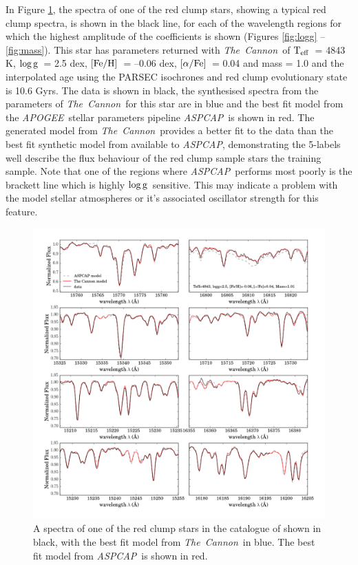 \documentclass[12pt, preprint]{aastex}
\newcommand{\project}[1]{\textsl{#1}}
\newcommand{\tc}{\project{The~Cannon}}
\newcommand{\apogee}{\project{APOGEE}}
\newcommand{\aspcap}{\project{ASPCAP}}
\newcommand{\teff}{\mbox{$\rm T_{eff}$}}
\newcommand{\feh}{\mbox{$\rm [Fe/H]$}}
\newcommand{\alphafe}{\mbox{$\rm [\alpha/Fe]$}}
\newcommand{\logg}{\mbox{$\rm \log g$}}
\begin{document}
In Figure \ref{fig:spectra}, the spectra of one of the red clump stars, showing a typical red clump spectra, is shown in the black line, for each of the wavelength regions for which the highest amplitude of the coefficients is shown (Figures \ref{fig:logg} -- \ref{fig:mass}).  This star has parameters returned with \tc\ of \teff\ = 4843 K, \logg\ = 2.5 dex, \feh\ = --0.06 dex, \alphafe\ = 0.04 and mass = 1.0 and the interpolated age using the PARSEC isochrones and red clump evolutionary state is 10.6 Gyrs. The data is shown in black, the synthesised spectra from the parameters of \tc\ for this star are in blue and the best fit model from the \apogee\ stellar parameters pipeline \aspcap\ is shown in red. The generated model from \tc\ provides a better fit to the data than the best fit synthetic model from available to \aspcap, demonstrating the 5-labels well describe the flux behaviour of the red clump sample stars the training sample. Note that one of the regions where \aspcap\ performs most poorly is the brackett line which is highly \logg\ sensitive. This may indicate a problem with the model stellar atmospheres or it's associated oscillator strength for this feature. 


\begin{figure}[p!]
\centering
      \includegraphics[scale=0.5]{./plots/spectra_fits_7.png}
  \caption{A spectra of one of the red clump stars in the catalogue of \citet{Bovy2014} shown in black, with the best fit model from \tc\ in blue. The best fit model from \aspcap\ is shown in red.}
\label{fig:spectra}
\end{figure}
\end{document}
